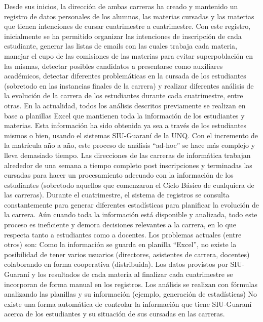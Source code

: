 Desde sus inicios, la dirección de ambas carreras ha creado y mantenido un registro de datos personales de los alumnos, las materias cursadas y las materias que tienen intenciones de cursar cuatrimestre a cuatrimestre. Con este registro, inicialmente se ha permitido organizar las intenciones de inscripción de cada estudiante, generar las listas de emails con las cuales trabaja cada materia, manejar el cupo de las comisiones de las materias para evitar superpoblación en las mismas, detectar posibles candidatos a presentarse como auxiliares académicos, detectar diferentes problemáticas en la cursada de los estudiantes (sobretodo en las instancias finales de la carrera) y realizar diferentes análisis de la evolución de la carrera de los estudiantes durante cada cuatrimestre, entre otras.
En la actualidad, todos los análisis descritos previamente se realizan en base a planillas Excel que mantienen toda la información de los estudiantes y materias. Esta información ha sido obtenida ya sea a través de los estudiantes mismos o bien, usando el sistemas SIU-Guaraní de la UNQ.
Con el incremento de la matrícula año a año, este proceso de análisis “ad-hoc” se hace más complejo y lleva demasiado tiempo. Las direcciones de las carreras de informática trabajan alrededor de una semana a tiempo completo post inscripciones y terminadas las cursadas para hacer un procesamiento adecuado con  la información de los estudiantes (sobretodo aquellos que comenzaron el Ciclo Básico de cualquiera de las carreras). Durante el cuatrimestre, el sistema de registros se consulta constantemente para generar diferentes estadísticas para planificar la evolución de la carrera. Aún cuando toda la información está disponible y analizada, todo este proceso es ineficiente y demora decisiones relevantes a la carrera, en lo que respecta tanto a estudiantes como a docentes. Los problemas actuales (entre otros) son:
Como la información se guarda en planilla “Excel”, no existe la posibilidad de tener varios usuarios (directores, asistentes de carrera, docentes) colaborando en forma cooperativa (distribuida).
Los datos provistos por SIU-Guaraní y los resultados de cada materia al finalizar cada cuatrimestre se incorporan de forma manual en los registros.
Los análisis se realizan con fórmulas analizando las planillas y su información (ejemplo, generación de estadísticas)
No existe una forma automática de controlar la información que tiene SIU-Guaraní acerca de los estudiantes y su situación de sus cursadas en las carreras.

